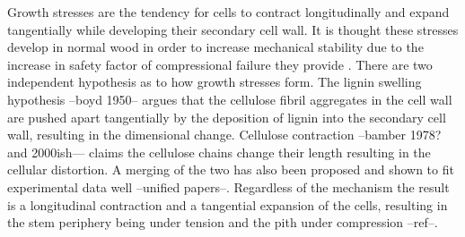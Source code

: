 Growth stresses are the tendency for cells to contract longitudinally and expand tangentially while developing their secondary cell wall. It is thought these stresses develop in normal wood in order to increase mechanical stability due to the increase in safety factor of compressional failure they provide \cite{mattheck1997wood}. There are two independent hypothesis as to how growth stresses form. The lignin swelling hypothesis --boyd 1950-- argues that the cellulose fibril aggregates in the cell wall are pushed apart tangentially by the deposition of lignin into the secondary cell wall, resulting in the dimensional change. Cellulose contraction --bamber 1978? and 2000ish--- claims the cellulose chains change their length resulting in the cellular distortion. A merging of the two has also been proposed and shown to fit experimental data well --unified papers--. Regardless of the mechanism the result is a longitudinal contraction and a tangential expansion of the cells, resulting in the stem periphery being under tension and the pith under compression --ref--. 